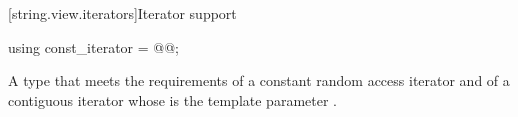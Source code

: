 \setcounter{subsubsection}{1}
[string.view.iterators]{Iterator support}
\begin{itemdecl}
using const_iterator = @@;
\end{itemdecl}

\begin{itemdescr}
\pnum
A type that meets the requirements
of a constant random access iterator and
of a contiguous iterator
whose  is the template parameter .

\pnum [...]
\end{itemdescr}
